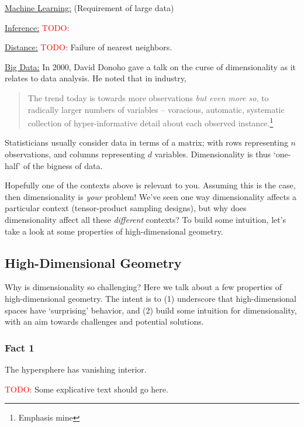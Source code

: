 \documentclass{article}
\begin{document}
\bigskip\noindent\underline{Machine Learning:} (Requirement of large data)

\bigskip\noindent\underline{Inference:} \textcolor{red}{TODO:}

\bigskip\noindent\underline{Distance:} \textcolor{red}{TODO:} Failure
of nearest neighbors.

\bigskip\noindent\underline{Big Data:} In 2000, David Donoho gave a talk on the
curse of dimensionality as it relates to data analysis.\cite{donoho2000high}
He noted that in industry,

\begin{quote}
  The trend today is towards more observations \emph{but even more so},
  \textcolor{palered}{to radically larger numbers of variables} – voracious,
  automatic, systematic collection of hyper-informative detail about each
  observed instance.\footnote{Emphasis mine}
\end{quote}

Statisticians usually consider data in terms of a matrix; with rows representing
$n$ observations, and columns representing $d$ variables. Dimensionality is thus
`one-half' of the bigness of data.

Hopefully one of the contexts above is relevant to you. Assuming this is the
case, then dimensionality is \emph{your} problem! We've seen one way
dimensionality affects a particular context (tensor-product sampling designs),
but why does dimensionality affect all these \emph{different} contexts? To build
some intuition, let's take a look at some properties of high-dimensional
geometry.

\subsection{High-Dimensional Geometry}
Why is dimensionality so challenging? Here we talk about a few properties of
high-dimensional geometry. The intent is to (1) underscore that high-dimensional
spaces have `surprising' behavior, and (2) build some intuition for
dimensionality, with an aim towards challenges and potential solutions.

\subsubsection{Fact 1}
The hypersphere has vanishing interior.

\bigskip
\textcolor{red}{TODO:} Some explicative text should go here.
\end{document}
